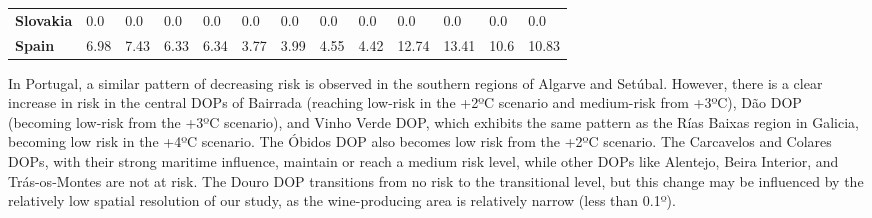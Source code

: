 \begin{table}[H]
{\begin{tabular}{lllllllllllll}
            \textbf{Slovakia}                                  &
            0.0                                                &
            0.0                                                &
            0.0                                                &
            0.0                                                &
            0.0                                                &
            0.0                                                &
            0.0                                                &
            0.0                                                &
            0.0                                                &
            0.0                                                &
            0.0                                                &
            0.0                                                  \\
            \textbf{Spain}                                     &
            6.98                                               &
            7.43                                               &
            6.33                                               &
            6.34                                               &
            3.77                                               &
            3.99                                               &
            4.55                                               &
            4.42                                               &
            12.74                                              &
            13.41                                              &
            10.6                                               &
            10.83                                                \\ \hline
        \end{tabular}%
    }
\end{table}

In Portugal, a similar pattern of decreasing risk is observed in the southern
regions of Algarve and Setúbal. However, there is a clear increase in risk in
the central DOPs of Bairrada (reaching low-risk in the +2ºC scenario and
medium-risk from +3ºC), Dão DOP (becoming low-risk from the +3ºC scenario), and
Vinho Verde DOP, which exhibits the same pattern as the Rías Baixas region in
Galicia, becoming low risk in the +4ºC scenario. The Óbidos DOP also becomes
low risk from the +2ºC scenario. The Carcavelos and Colares DOPs, with their
strong maritime influence, maintain or reach a medium risk level, while other
DOPs like Alentejo, Beira Interior, and Trás-os-Montes are not at risk. The
Douro DOP transitions from no risk to the transitional level, but this change
may be influenced by the relatively low spatial resolution of our study, as the
wine-producing area is relatively narrow (less than 0.1º).

